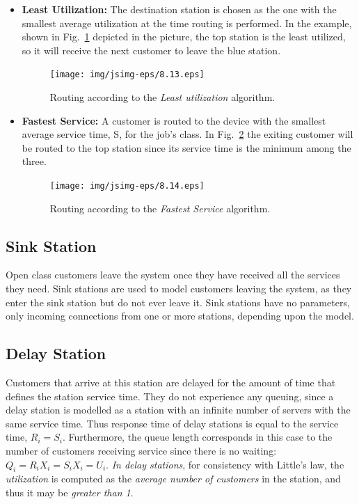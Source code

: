 \begin{itemize}
\item \textbf{Least Utilization:} The destination station is
chosen as the one with the smallest average utilization at the
time routing is performed. In the example, shown in
Fig.~\ref{fig:routleasut} depicted in the picture, the top station
is the least utilized, so it will receive the next customer to
leave the blue station.
\begin{figure}[htb]
    \begin{center}
        \texttt{[image: img/jsimg-eps/8.13.eps]}
    \end{center}
    \caption{Routing according to the \emph{Least utilization} algorithm.}
    \label{fig:routleasut}
\end{figure}

\item \textbf{Fastest Service:} A customer is routed to the device
with the smallest average service time, S, for the job's class. In
Fig.~\ref{fig:routfastserv} the exiting customer will be routed to
the top station since its service time is the minimum among the
three.
\begin{figure}[htb]
    \begin{center}
        \texttt{[image: img/jsimg-eps/8.14.eps]}
    \end{center}
    \caption{Routing according to the \emph{Fastest Service}
    algorithm.}
    \label{fig:routfastserv}
\end{figure}
\end{itemize}

\subsection{Sink Station} Open class customers leave the
system once they have received all the services they need. Sink
stations are used to model customers leaving the system, as they
enter the sink station but do not ever leave it. Sink stations
have no parameters, only incoming connections from one or more
stations, depending upon the model.

\subsection{Delay Station}
\label{dstat} Customers that arrive at this
station are delayed for the amount of time that defines the
station service time. They do not experience any queuing, since a
delay station is modelled as a station with an infinite number of
servers with the same service time. Thus response time of delay
stations is equal to the service time, $R_i = S_i$. Furthermore,
the queue length corresponds in this case to the number of
customers receiving service since there is no waiting: $Q_i = R_i
X_i = S_i X_i = U_i$. \emph{In delay stations}, for consistency
with Little's law, the \emph{utilization} is computed as the
\emph{average number of customers} in the station, and thus it may
be \emph{greater than 1}.

